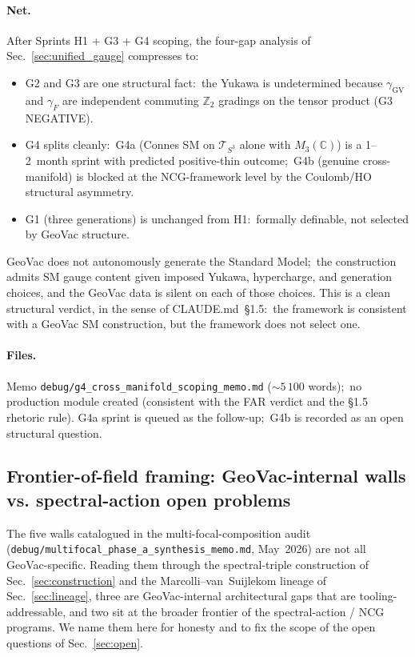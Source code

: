 \documentclass[11pt]{article}
\begin{document}
\paragraph{Net.}  After Sprints H1 + G3 + G4 scoping, the
four-gap analysis of Sec.~\ref{sec:unified_gauge} compresses to:

\begin{itemize}\setlength{\itemsep}{2pt}
\item G2 and G3 are one structural fact:\ the Yukawa is
undetermined because $\gamma_{\mathrm{GV}}$ and $\gamma_F$ are
independent commuting $\mathbb{Z}_2$ gradings on the tensor product
(G3 NEGATIVE).
\item G4 splits cleanly:\ G4a (Connes SM on $\mathcal{T}_{S^3}$
alone with $M_3(\mathbb{C})$) is a 1--2~month sprint with predicted
positive-thin outcome;\ G4b (genuine cross-manifold) is blocked at
the NCG-framework level by the Coulomb/HO structural asymmetry.
\item G1 (three generations) is unchanged from H1:\ formally
definable, not selected by GeoVac structure.
\end{itemize}

GeoVac does not autonomously generate the Standard Model;\ the
construction admits SM gauge content given imposed Yukawa,
hypercharge, and generation choices, and the GeoVac data is silent
on each of those choices.  This is a clean structural verdict, in
the sense of CLAUDE.md~\S 1.5:\ the framework is consistent with a
GeoVac SM construction, but the framework does not select one.

\paragraph{Files.}  Memo
\texttt{debug/g4\_cross\_manifold\_scoping\_memo.md}
($\sim 5\,100$ words);\ no production module created (consistent
with the FAR verdict and the §1.5 rhetoric rule).  G4a sprint is
queued as the follow-up;\ G4b is recorded as an open structural
question.

\subsection{Frontier-of-field framing: GeoVac-internal walls vs.
  spectral-action open problems}
\label{sec:frontier_framing}

The five walls catalogued in the multi-focal-composition audit
(\texttt{debug/multifocal\_phase\_a\_synthesis\_memo.md}, May~2026)
are not all GeoVac-specific.  Reading them through the spectral-triple
construction of Sec.~\ref{sec:construction} and the Marcolli--van~Suijlekom
lineage of Sec.~\ref{sec:lineage}, three are GeoVac-internal architectural
gaps that are tooling-addressable, and two sit at the broader frontier
of the spectral-action / NCG programs.  We name them here for honesty
and to fix the scope of the open questions of Sec.~\ref{sec:open}.
\end{document}
